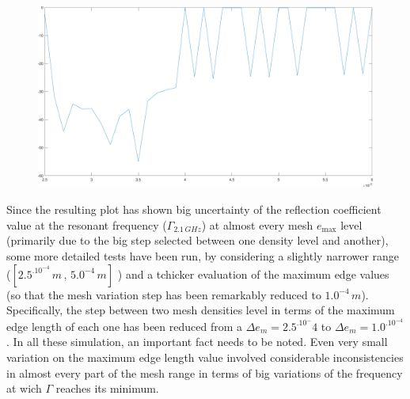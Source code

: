 \documentclass[12pt,a4paper]{article}
\begin{document}
{\begin{figure}[h]
\begin{center}
			\includegraphics[scale=0.3]{mesh_first_test.pdf}
		\end{center}
	\end{figure}
	Since the resulting plot has shown big uncertainty of the reflection coefficient value at the resonant frequency ($\Gamma_{2.1\,GHz}$) at almost every mesh $e_{\max}$ level (primarily due to the big step selected between one density level and another), some more detailed tests have been run, by considering a slightly narrower range ($[2.5^.10^{-4}\,m\,,\,5.0^{-4}\,m]$ ) and a tchicker evaluation of the maximum edge values (so that the mesh variation step has been remarkably reduced to $1.0^{-4}\,m$). Specifically, the step between two mesh densities level in terms of the maximum edge length of each one has been reduced from a $\Delta e_m=2.5^.10^-4$ to $\Delta e_m=1.0^.10^{-4}$. In all these simulation, an important fact needs to be noted. Even very small variation on the maximum edge length value involved considerable inconsistencies in almost every part of the mesh range in terms of big variations of the frequency at wich $\Gamma$ reaches its minimum.  
}
\end{document}
